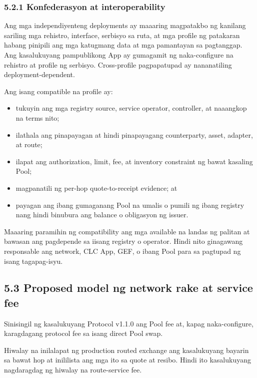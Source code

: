 \documentclass[11pt]{article}
\begin{document}
\subsubsection*{5.2.1 Konfederasyon at interoperability}

Ang mga independiyenteng deployments ay maaaring magpatakbo ng kanilang sariling mga rehistro, interface, serbisyo sa ruta, at mga profile ng patakaran habang pinipili ang mga katugmang data at mga pamantayan sa pagtanggap. Ang kasalukuyang pampublikong App ay gumagamit ng naka-configure na rehistro at profile ng serbisyo. Cross-profile pagpapatupad ay nananatiling deployment-dependent.

Ang isang compatible na profile ay:

\begin{itemize}[leftmargin=*]
\item tukuyin ang mga registry source, service operator, controller, at naaangkop na terms nito;
\item ilathala ang pinapayagan at hindi pinapayagang counterparty, asset, adapter, at route;
\item ilapat ang authorization, limit, fee, at inventory constraint ng bawat kasaling Pool;
\item magpanatili ng per-hop quote-to-receipt evidence; at
\item payagan ang ibang gumaganang Pool na umalis o pumili ng ibang registry nang hindi binubura ang balance o obligasyon ng issuer.
\end{itemize}
Maaaring paramihin ng compatibility ang mga available na landas ng palitan at bawasan ang pagdepende sa iisang registry o operator. Hindi nito ginagawang responsable ang network, CLC App, GEF, o ibang Pool para sa pagtupad ng isang tagapag-isyu.

\subsection*{5.3 Proposed model ng network rake at service fee}

Sinisingil ng kasalukuyang Protocol v1.1.0 ang Pool fee at, kapag naka-configure, karagdagang protocol fee sa isang direct Pool swap.

Hiwalay na inilalapat ng production routed exchange ang kasalukuyang bayarin sa bawat hop at inililista ang mga ito sa quote at resibo. Hindi ito kasalukuyang nagdaragdag ng hiwalay na route-service fee.
\end{document}
